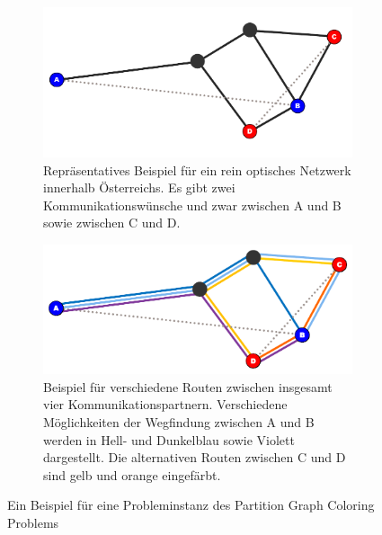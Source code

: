 \begin{figure}
	\centering
	\begin{subfigure}{\textwidth}
		\includegraphics{img/bsp1}
		\caption{Repräsentatives Beispiel für ein rein optisches Netzwerk innerhalb Österreichs. Es gibt zwei Kommunikationswünsche und zwar zwischen A und B sowie zwischen C und D.}
		\label{fig:example:a}
	\end{subfigure}
	\begin{subfigure}{\textwidth}
		\includegraphics{img/bsp2}
		\caption{Beispiel für verschiedene Routen zwischen insgesamt vier Kommunikationspartnern. Verschiedene Möglichkeiten der Wegfindung zwischen A und B werden in Hell- und Dunkelblau sowie Violett dargestellt. Die alternativen Routen zwischen C und D sind gelb und orange eingefärbt.}
		\label{fig:example:b}
	\end{subfigure}
	\caption{Ein Beispiel für eine Probleminstanz des Partition Graph Coloring Problems}
	\label{fix:example}
\end{figure}

